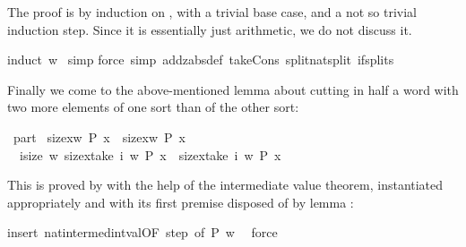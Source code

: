 \begin{isabellebody}
\begin{isamarkuptxt}
The proof is by induction on , with a trivial base case, and a not
so trivial induction step. Since it is essentially just arithmetic, we do not
discuss it.%
\end{isamarkuptxt}%
induct\ w{\isacharparenright}\isanewline
\ simp{\isacharparenright}\isanewline
{}force\ simp\ add{\isacharcolon}zabs{\isacharunderscore}def\ take{\isacharunderscore}Cons\ split{\isacharcolon}nat{\isachardot}split\ if{\isacharunderscore}splits{\isacharparenright}%
\begin{isamarkuptext}%
Finally we come to the above-mentioned lemma about cutting in half a word with two more elements of one sort than of the other sort:%
\end{isamarkuptext}%
\ part{}{\isacharcolon}\isanewline
\ {\isachardoublequote}size{\isacharbrackleft}x{\isasymin}w{\isachardot}\ P\ x{\isacharbrackright}\ {\isacharequal}\ size{\isacharbrackleft}x{\isasymin}w{\isachardot}\ {\isasymnot}P\ x{\isacharbrackright}{\isacharplus}{}\ {\isasymLongrightarrow}\isanewline
\ \ {\isasymexists}i{\isasymle}size\ w{\isachardot}\ size{\isacharbrackleft}x{\isasymin}take\ i\ w{\isachardot}\ P\ x{\isacharbrackright}\ {\isacharequal}\ size{\isacharbrackleft}x{\isasymin}take\ i\ w{\isachardot}\ {\isasymnot}P\ x{\isacharbrackright}{\isacharplus}{}{\isachardoublequote}%
\begin{isamarkuptxt}%
\noindent
This is proved by  with the help of the intermediate value theorem,
instantiated appropriately and with its first premise disposed of by lemma
:%
\end{isamarkuptxt}%
insert\ nat{}{\isacharunderscore}intermed{\isacharunderscore}int{\isacharunderscore}val{\isacharbrackleft}OF\ step{}{\isacharcomma}\ of\ {\isachardoublequote}P{\isachardoublequote}\ {\isachardoublequote}w{\isachardoublequote}\ {\isachardoublequote}{\isacharhash}{}{\isachardoublequote}{\isacharbrackright}{\isacharparenright}\isanewline
{}\ force%
\begin{isamarkuptext}%
\noindent


\end{isamarkuptext}
\end{isabellebody}
